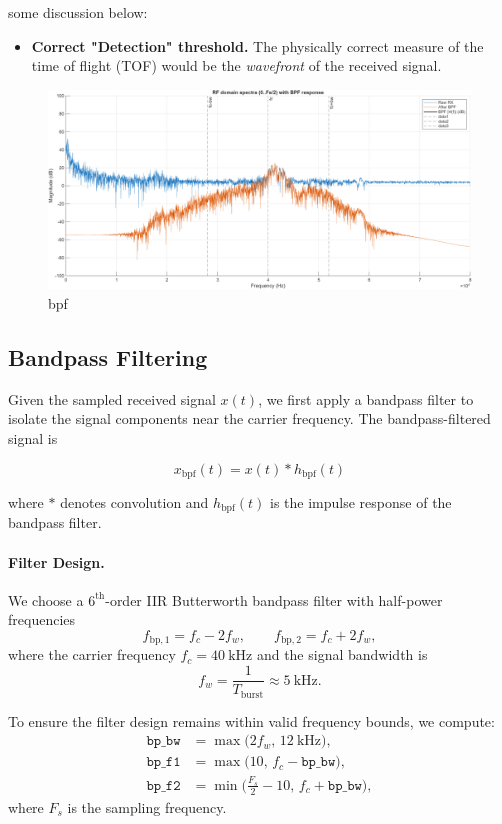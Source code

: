 \documentclass[10pt]{article}
\begin{document}
some discussion below:
\begin{itemize}
	\item \textbf{Correct "Detection" threshold. } The physically correct measure of the time of flight (TOF) would be the \textit{wavefront} of the received signal.
\end{itemize}

\begin{figure}[!h]
	\centering 
		\includegraphics[width = .75\columnwidth]{fig/100_fdomain_bpf.png}	
	\caption{bpf}
\label{fig:bpf}
\end{figure}

\subsection*{Bandpass Filtering}

Given the sampled received signal $x(t)$, we first apply a bandpass filter to isolate the signal components near the carrier frequency. The bandpass-filtered signal is

\begin{equation}
x_{\mathrm{bpf}}(t) = x(t) * h_{\mathrm{bpf}}(t)
\end{equation}

where $*$ denotes convolution and $h_{\mathrm{bpf}}(t)$ is the impulse response of the bandpass filter.  

\paragraph{Filter Design.}
We choose a $6^{\text{th}}$-order IIR Butterworth bandpass filter with half-power frequencies
\[
f_{\mathrm{bp},1} = f_c - 2f_w, \qquad
f_{\mathrm{bp},2} = f_c + 2f_w,
\]
where the carrier frequency $f_c = 40~\mathrm{kHz}$ and the signal bandwidth is
\[
f_w = \frac{1}{T_{\mathrm{burst}}} \approx 5~\mathrm{kHz}.
\]

To ensure the filter design remains within valid frequency bounds, we compute:
\[
\begin{aligned}
\texttt{bp\_bw} &= \max\!\bigl(2f_w,\, 12~\mathrm{kHz}\bigr),\\[4pt]
\texttt{bp\_f1} &= \max\!\bigl(10,\, f_c - \texttt{bp\_bw}\bigr),\\[4pt]
\texttt{bp\_f2} &= \min\!\bigl(\tfrac{F_s}{2}-10,\, f_c + \texttt{bp\_bw}\bigr),
\end{aligned}
\]
where $F_s$ is the sampling frequency.
\end{document}
